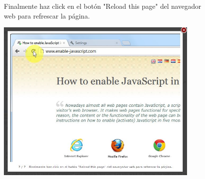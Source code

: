 \documentclass[11pt]{article} %
\begin{document}
\begin{figure}
\begin{center}
\begin{center}
Finalmente haz click en el botón "Reload this page" del navegador web para refrescar la página.
\end{center}

\includegraphics[height=8cm, width=8 cm] {chrome 07.jpg}

\end{center}
\end{figure}

\lstset{language=Pascal}          %
\end{document}
